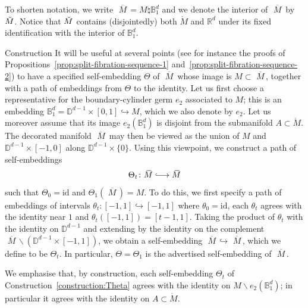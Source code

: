 \documentclass[AHL,Unicode,published]{cedram}
\newcommand{\id}{\mathrm{id}}
\newcommand{\Int}{\mathring}
\newcommand{\rgM}{\mathring{M}}
\newcommand{\mbar}{\ensuremath{{\,\,\overline{\!\! M\!}\,}}}
\newcommand{\bB}{\mathbb{B}}
\newcommand{\bD}{\mathbb{D}}
\newcommand{\bR}{\mathbb{R}}
\newcommand{\longhookrightarrow}{\lhook\joinrel\longrightarrow}
\begin{document}
\begin{notation}\label{not:union-with-Z}
To shorten notation, we write $\mbar = M \natural
\bB^d_{1}$ and we denote the interior of $\mbar$ by $\Breve{M}$. Notice that $\Breve{M}$ contains (disjointedly) both $\Int{M}$ and $\bR^d$ under its fixed identification with the interior of $\bB^d_{1}$.
\end{notation}

\begin{enonce}
{Construction}\label{construction:Theta}
It will be useful at several points (see for instance the proofs of Propositions~\ref{prop:split-fibration-sequence-1} and~\ref{prop:split-fibration-sequence-2}) to have a specified self-embedding $\Theta$ of $\mbar$ whose image is $M \subset \mbar$, together with a path of embeddings from $\Theta$ to the identity. Let us first choose a representative for the boundary-cylinder germ $e_2$ associated to $M$; this is an embedding $\bB^d_1 = \bD^{d-1} \times [0,1] \hookrightarrow M$, which we also denote by $e_2$. Let us moreover assume that its image $e_2(\bB^d_1)$ is disjoint from the submanifold $A \subset \rgM$. The decorated manifold $\mbar$ may then be viewed as the union of $M$ and $\bD^{d-1} \times [-1,0]$ along $\bD^{d-1} \times \{0\}$. Using this viewpoint, we construct a path of self-embeddings
\[
\Theta_t \colon \mbar \longhookrightarrow \mbar
\]
such that $\Theta_0 = \id$ and $\Theta_1(\mbar) = M$. To do this, we first specify a path of embeddings of intervals $\theta_t \colon [-1,1] \hookrightarrow [-1,1]$ where $\theta_0 = \id$, each $\theta_t$ agrees with the identity near $1$ and $\theta_t([-1,1]) = [t-1,1]$. Taking the product of $\theta_t$ with the identity on $\bD^{d-1}$ and extending by the identity on the complement $\mbar \smallsetminus (\bD^{d-1} \times [-1,1])$, we obtain a self-embedding $\mbar \hookrightarrow \mbar$, which we define to be $\Theta_t$. In particular, $\Theta = \Theta_1$ is the advertised self-embedding of $\mbar$.
\end{enonce}

\begin{rema}
We emphasise that, by construction, each self-embedding $\Theta_t$ of Construction~\ref{construction:Theta} agrees with the identity on $M \smallsetminus e_2(\bB^d_1)$; in particular it agrees with the identity on $A \subset \rgM$.
\end{rema}
\end{document}
